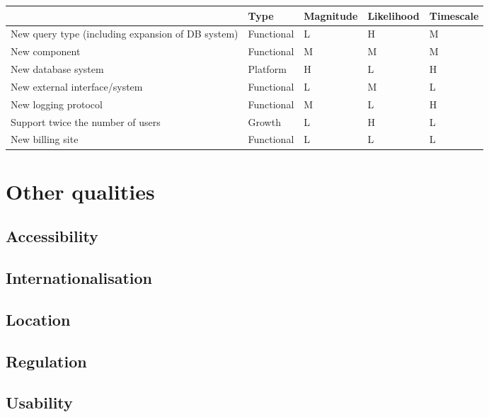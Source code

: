 \begin{table}[ht]\label{tab:evolution}
\centering
\begin{tabular}{| p{5cm} | l | l | l | l |}
    \hline
    & Type & Magnitude & Likelihood & Timescale \\ \hline \hline
    New query type (including expansion of DB system) & Functional & L & H & M \\ \hline
    New component & Functional & M & M & M \\ \hline
    New database system & Platform & H & L & H \\ \hline
    New external interface/system & Functional & L & M & L \\ \hline
    New logging protocol & Functional & M & L & H \\ \hline
    Support twice the number of users & Growth & L & H & L \\ \hline
    New billing site & Functional & L & L & L \\ \hline
\end{tabular}
\end{table}


\section{Other qualities}
\label{sec:other-qualities}

\subsection{Accessibility}
\label{sec:accessibility}


\subsection{Internationalisation}
\label{sec:internationalisation}


\subsection{Location}
\label{sec:location}


\subsection{Regulation}
\label{sec:regulation}


\subsection{Usability}
\label{sec:usability}


